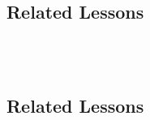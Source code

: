 \subsection{Related Lessons} 
\fourbThree{}\\
\fourFKThirtyThree{}\\
%
\subsection{Related Lessons} 
\fourbThree{}\\
\fourbTen{}\\
\fourbEleven{}\\
